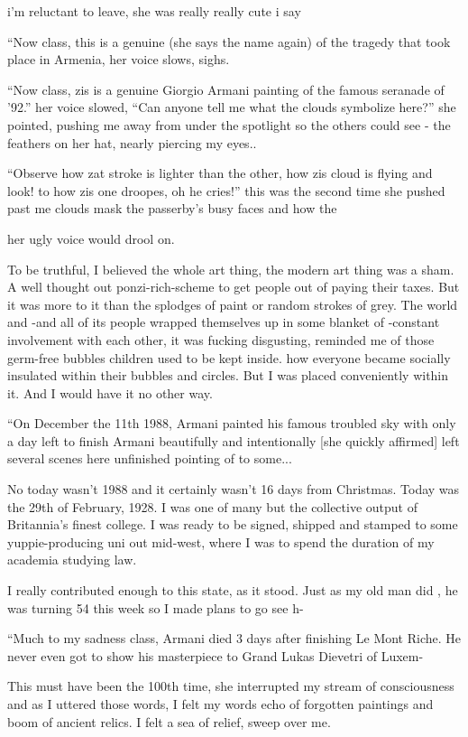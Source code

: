 \documentclass[19pt,openany]{book}
\begin{document}
i'm reluctant to leave, she was really really cute i say

``Now class, this is a genuine
(she says the name again) of the
tragedy that took place in Armenia,
her voice slows, sighs.

``Now class, zis is a genuine
Giorgio Armani painting
of the famous seranade of '92.''
her voice slowed, ``Can anyone tell me
what the clouds symbolize
here?'' she pointed, pushing
me away from under the spotlight so the others could see
- the feathers on her hat, nearly piercing
my eyes..

``Observe how zat stroke is lighter
than the other, how zis cloud
is flying and
look! to how
zis one droopes, oh
he cries!'' this was the second
time she pushed past me
clouds mask the passerby's
busy faces and how the

her ugly voice would drool on.

To be truthful, I believed
the whole art thing, the
modern art thing was a sham.
A well thought out
ponzi-rich-scheme
to get people out of paying their taxes.
But it was more to it
than the splodges of paint or
random strokes of grey.
The world and -and all of
its people wrapped
themselves up in some
blanket of -constant
involvement with each other,
it was fucking disgusting,
reminded me of those
germ-free bubbles children
used to be kept inside.
how everyone became socially
insulated within their bubbles
and circles.
But I was placed conveniently
within it. And I would
have it no other way.

``On December the 11th
1988, Armani painted
his famous troubled sky
with only a day left
to finish Armani beautifully
and intentionally
[she quickly affirmed]
left several scenes here
unfinished pointing of to some...

No today wasn't 1988
and it certainly wasn't
16 days from Christmas.
Today was the 29th
of February, 1928. I
was one of many but
the collective output
of Britannia's finest
college. I was
ready to be signed,
shipped and stamped
to some yuppie-producing uni
out mid-west, where
I was to spend the duration
of my academia studying law.

I really contributed
enough to this state,
as it stood. Just as my old man did ,
he was turning 54 this week
so I made plans to go see h-

``Much to my sadness
class,
Armani died 3 days after
finishing Le Mont Riche.
He never even got to show
his masterpiece to Grand
Lukas Dievetri of Luxem-


This must have been the 100th time, she interrupted
my stream of consciousness and as I uttered
those words, I felt my words echo
of forgotten paintings and boom of ancient
relics. I felt a sea of relief,
sweep over me.
\end{document}
